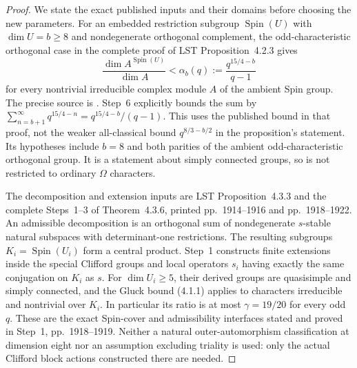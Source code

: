 \begin{proof}
We state the exact published inputs and their domains before
choosing the new parameters.
For an embedded restriction subgroup $\operatorname{Spin}(U)$
with $\dim U=b\ge8$ and nondegenerate orthogonal complement,
the odd-characteristic orthogonal case in the complete proof
of LST Proposition~4.2.3 gives
\[
 \frac{\dim A^{\operatorname{Spin}(U)}}{\dim A}
       <\alpha_b(q):=\frac{q^{15/4-b}}{q-1}
 \tag{SPO.9}
\]
for every nontrivial irreducible complex module $A$ of the
ambient Spin group.  The precise source is
\cite[Proposition~4.2.3, pp.~1909--1912, its odd-orthogonal
case in Step~1 and the $s=1$ summation in Step~6, p.~1912]{HOS:LST2011}.
Step~6 explicitly bounds the sum by
$\sum_{n=b+1}^{\infty}q^{15/4-n}=q^{15/4-b}/(q-1)$.
This uses the published bound in that proof, not the weaker
all-classical bound $q^{8/3-b/2}$ in the proposition's statement.
Its hypotheses include $b=8$ and both parities of the ambient
odd-characteristic orthogonal group.  It is a statement about
simply connected groups, so is not restricted to ordinary
$\Omega$ characters.

The decomposition and extension inputs are LST
Proposition~4.3.3 and the complete Steps~1--3 of Theorem~4.3.6,
printed pp.~1914--1916 and pp.~1918--1922.
An admissible decomposition is an orthogonal sum of nondegenerate
$s$-stable natural subspaces with determinant-one restrictions.
The resulting subgroups $K_i=\operatorname{Spin}(U_i)$ form a
central product.  Step~1 constructs finite extensions inside
the special Clifford groups and local operators $s_i$ having
exactly the same conjugation on $K_i$ as $s$.
For $\dim U_i\ge5$, their derived groups are quasisimple and
simply connected, and the Gluck bound (4.1.1) applies to
characters irreducible and nontrivial over $K_i$.
In particular its ratio is at most $\gamma=19/20$ for every
odd $q$.  These are the exact Spin-cover and admissibility
interfaces stated and proved in Step~1, pp.~1918--1919.
Neither a natural outer-automorphism classification at dimension
eight nor an assumption excluding triality is used: only the
actual Clifford block actions constructed there are needed.


\end{proof}
